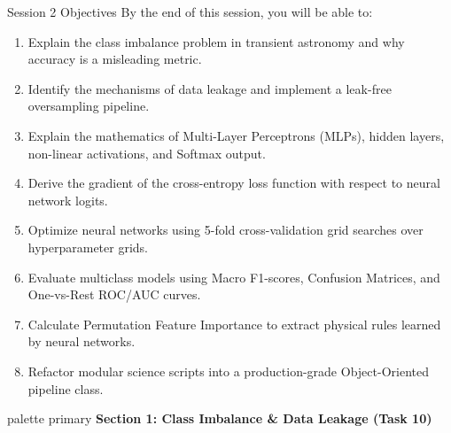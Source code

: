 \documentclass[9pt]{beamer}
\begin{document}
\begin{frame}{Session 2 Objectives}
  By the end of this session, you will be able to:
  \begin{enumerate}
    \item Explain the class imbalance problem in transient astronomy and why accuracy is a misleading metric.
    \item Identify the mechanisms of data leakage and implement a leak-free oversampling pipeline.
    \item Explain the mathematics of Multi-Layer Perceptrons (MLPs), hidden layers, non-linear activations, and Softmax output.
    \item Derive the gradient of the cross-entropy loss function with respect to neural network logits.
    \item Optimize neural networks using 5-fold cross-validation grid searches over hyperparameter grids.
    \item Evaluate multiclass models using Macro F1-scores, Confusion Matrices, and One-vs-Rest ROC/AUC curves.
    \item Calculate Permutation Feature Importance to extract physical rules learned by neural networks.
    \item Refactor modular science scripts into a production-grade Object-Oriented pipeline class.
  \end{enumerate}
\end{frame}

\begin{frame}[plain]
  \vfill
  \centering
  \begin{beamercolorbox}[sep=8pt,center,shadow=true,rounded=true]{palette primary}
    \textbf{Section 1: Class Imbalance \& Data Leakage (Task 10)}
  \end{beamercolorbox}
  \vfill
\end{frame}
\end{document}
